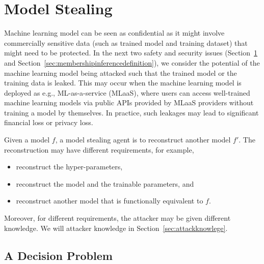 \section{Model Stealing}\label{sec:modelstealingdefinition}

Machine learning model can be seen as confidential as it might involve commercially sensitive data (such as trained model and training dataset) that might need to be protected. In the next two safety and security issues (Section~\ref{sec:modelstealingdefinition} and Section~\ref{sec:membershipinferencedefinition}), we consider the potential of the machine learning model being attacked such that the trained model or the training data is leaked. This may occur when the machine learning model is deployed as e.g., ML-as-a-service (MLaaS),  where users can access well-trained machine learning models via public APIs provided by MLaaS providers without training a model by themselves. In practice, such leakages may lead to significant financial loss or privacy loss.   

Given a model $f$, a model stealing agent is to reconstruct another model $f'$. The reconstruction may have different requirements, for example, 
\begin{itemize}
    \item reconstruct the hyper-parameters,
    \item reconstruct the model and the trainable parameters, and 
    \item reconstruct another model that is functionally equivalent to $f$. 
\end{itemize}
Moreover, for different requirements, the attacker may be given different knowledge. We will attacker knowledge in Section~\ref{sec:attackknowlege}.



\iffalse
\subsection*{A Decision Problem}

